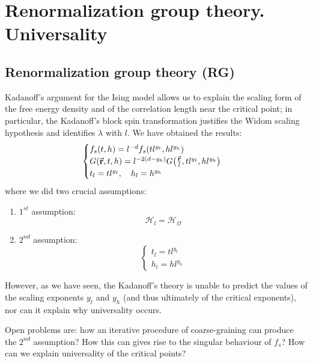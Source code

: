 \documentclass[../main/main.tex]{subfiles}
\begin{document}
\chapter{Renormalization group theory. Universality}


\section{Renormalization group theory (RG)}

Kadanoff's argument for the Ising model allows us to explain the scaling form of the free energy density and of the correlation length near the critical point; in particular, the Kadanoff's block spin transformation justifies the Widom scaling hypothesis and identifies \( \lambda  \) with \( l \). We have obtained the results:
\begin{equation*}
  \begin{cases}
   f_s (t,h) = l^{-d} f_s \qty(t l^{y_t}, h l^{y_h}) \\
   G (\va{r},t,h) = l^{-2(d-y_h)} G \qty(\frac{\va{r}}{l}, t l^{y_t}, h l^{y_h}) \\
   t_l = t l ^{y_t}, \quad h_l = h^{y_h}
  \end{cases}
\end{equation*}
where we did two crucial assumptions:
\begin{enumerate}
\item \( 1^{st} \) assumption:
 \begin{equation*}
  \mathcal{H}_l = \mathcal{H}_\Omega
\end{equation*}
\item \( 2^{nd} \) assumption:
\begin{equation*}
  \begin{cases}
   t_l = t l^{y_t}\\
   h_l = h l^{y_h}
  \end{cases}
\end{equation*}
\end{enumerate}
 \noindent However, as we have seen, the Kadanoff's theory is unable to predict the values of the scaling exponents \( y_t \) and \( y_h \)  (and thus ultimately of the critical exponents), nor can it explain why universality occurs.

 \begin{remark}
 Open problems are: how an iterative procedure of coarse-graining can produce the \( 2^{nd} \) assumption? How this can gives rise to the singular behaviour of \( f_s \)? How can we explain universality of the critical points?
 \end{remark}
\end{document}
